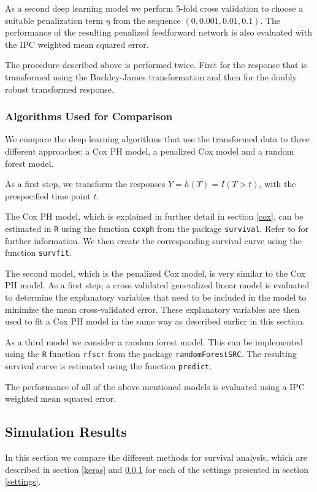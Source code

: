 \documentclass[12pt, a4paper]{scrartcl}
\theoremstyle{definition}
\theoremstyle{plain}
\numberwithin{equation}{section}
\numberwithin{figure}{section}
\numberwithin{table}{section}
\begin{document}
	As a second deep learning model we perform 5-fold cross validation to choose a suitable penalization term $\eta$ from the sequence $(0, 0.001, 0.01, 0.1)$.
	The performance of the resulting penalized feedforward network is also evaluated with the IPC weighted mean squared error.
	
	The procedure described above is performed twice.
	First for the response that is transformed using the Buckley-James transformation and then for the doubly robust transformed response.
	\subsubsection{Algorithms Used for Comparison}\label{comp}
	
	We compare the deep learning algorithms that use the transformed data to three different approaches: a Cox PH model, a penalized Cox model and a random forest model.
	
	As a first step, we transform the responses $Y=h(T)=I(T>t)$, with the prespecified time point $t$.
	
	The Cox PH model, which is explained in further detail in section \ref{cox}, can be estimated in \texttt{R} using the function \texttt{coxph} from the package \texttt{survival}.
	Refer to \citet*{survival-package} for further information.
	We then create the corresponding survival curve using the function \texttt{survfit}.
	
	The second model, which is the penalized Cox model, is very similar to the Cox PH model.
	As a first step, a cross validated generalized linear model is evaluated to determine the explanatory variables that need to be included in the model to minimize the mean cross-validated error.
	These explanatory variables are then used to fit a Cox PH model in the same way as described earlier in this section.
	
	As a third model we consider a random forest model.
	This can be implemented using the \texttt{R} function \texttt{rfscr} from the package \texttt{randomForestSRC}.
	The resulting survival curve is estimated using the function \texttt{predict}.
	
	The performance of all of the above mentioned models is evaluated using a IPC weighted mean squared error.
	
	\subsection{Simulation Results}
	In this section we compare the different methods for survival analysis, which are described in section \ref{keras} and \ref{comp}  for each of the settings presented in section \ref{settings}.
	
\end{document}
